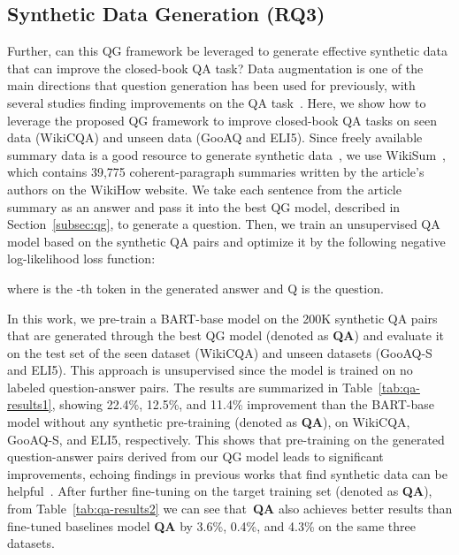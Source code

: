 \documentclass[11pt]{article}
\begin{document}
\subsection{Synthetic Data Generation (RQ3)}

Further, can this QG framework be leveraged to generate effective synthetic data that can improve the closed-book QA task? Data augmentation is one of the main directions that question generation has been used for previously, with several studies finding improvements on the QA task~\cite{lewis-etal-2019-unsupervised,alberti-etal-2019-synthetic}. Here, we show how to leverage the proposed QG framework to improve closed-book QA tasks on seen data (WikiCQA) and unseen data (GooAQ and ELI5). Since freely available summary data is a good resource to generate synthetic data~\cite{lyu-etal-2021-improving}, we use WikiSum~\cite{cohen-etal-2021-wikisum}, which contains 39,775 coherent-paragraph summaries written by the article's authors on the WikiHow website. We take each sentence from the article summary as an answer and pass it into the best QG model, described in Section~\ref{subsec:qg}, to generate a question.
Then, we train an unsupervised QA model based on the synthetic QA pairs and optimize it by the following negative log-likelihood loss function:

where  is the -th token in the generated answer and Q is the question.

In this work, we pre-train a BART-base model on the 200K synthetic QA pairs that are generated through the best QG model (denoted as \textbf{QA}) and evaluate it on the test set of the seen dataset (WikiCQA) and unseen datasets (GooAQ-S and ELI5). This approach is unsupervised since the model is trained on no labeled question-answer pairs. The results are summarized in Table~\ref{tab:qa-results1}, showing 22.4\%, 12.5\%, and 11.4\% improvement than the BART-base model without any synthetic pre-training (denoted as \textbf{QA}), on WikiCQA, GooAQ-S, and ELI5, respectively. This shows that pre-training on the generated question-answer pairs derived from our QG model leads to significant improvements, echoing findings in previous works that find synthetic data can be helpful~\cite{khashabi-etal-2021-gooaq-open,lewis-etal-2021-paq,ding2021learning}. After further fine-tuning on the target training set (denoted as \textbf{QA}), from Table~\ref{tab:qa-results2} we can see that~\textbf{QA} also achieves better results than fine-tuned baselines model \textbf{QA} by 3.6\%, 0.4\%, and 4.3\% on the same three datasets.
\end{document}
